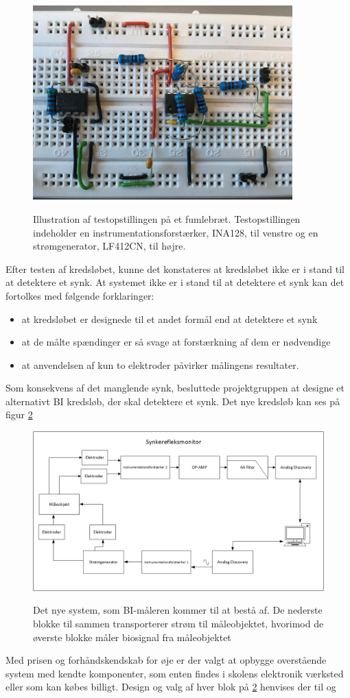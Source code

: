 \begin{figure}[H]
\centering
{\includegraphics[width=10cm]
{Figure/oprindeligekredslob2}}
\caption{Illustration af testopstillingen på et fumlebræt. Testopstillingen indeholder en instrumentationsforstærker, INA128, til venstre og en strømgenerator, LF412CN, til højre.}
\label{fig:celler}
\end{figure}

Efter testen af kredsløbet, kunne det konstateres at kredsløbet ikke er i stand til at detektere et synk.  At systemet ikke er i stand til at detektere et synk kan det fortolkes med følgende forklaringer:


 
\begin{itemize}
\item at kredsløbet er designede til et andet formål end at detektere et synk
\item at de målte spændinger er så svage at forstærkning af dem er nødvendige
\item at anvendelsen af kun to elektroder påvirker målingens resultater.  
\end{itemize}

Som konsekvens af det manglende synk, besluttede projektgruppen at designe et alternativt BI kredsløb, der skal detektere et synk. Det nye kredsløb kan ses på figur \ref{fig:konklusiondiagram}

\begin{figure}[H]
\centering
{\includegraphics[width=\linewidth]
{Figure/konklusiondiagram}}
\caption{Det nye system, som BI-måleren kommer til at bestå af. De nederste blokke til sammen transporterer strøm til måleobjektet, hvorimod de øverste blokke måler biosignal fra måleobjektet }
\label{fig:konklusiondiagram}
\end{figure} 

Med prisen og forhåndskendskab for øje er der valgt at opbygge overstående system  med kendte  komponenter, som enten findes i skolens elektronik værksted eller som kan købes billigt. Design og valg af hver blok på \ref{fig:konklusiondiagram} henvises der til  og  